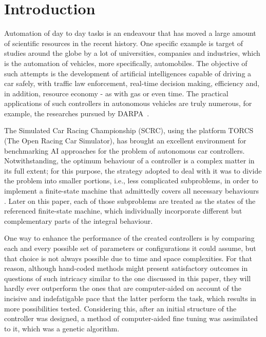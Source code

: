 \section{\textbf{Introduction}} \label{sec:Intro}

	Automation of day to day tasks is an endeavour that has moved a large amount of scientific resources in the
	recent history. One specific example is target of studies around the globe by a lot of universities, companies
	and industries, which is the automation of vehicles, more specifically, automobiles. The objective of such
	attempts is the development of artificial intelligences capable of driving a car safely, with traffic law
	enforcement, real-time decision making, efficiency and, in addition, resource economy - as with gas or even
	time. The practical applications of such controllers in autonomous vehicles are truly numerous, for example, the
	researches pursued by DARPA~\cite{DARPA}.


	The Simulated Car Racing Championship (SCRC), using the platform TORCS (The Open Racing Car Simulator), has
	brought an excellent environment for benchmarking AI approaches for the problem of autonomous car controllers.
	Notwithstanding, the optimum behaviour of a controller is a complex matter in its full extent; for this purpose,
	the strategy adopted to deal with it  was to divide the problem into smaller portions, i.e., less complicated
	subproblems, in order to implement a finite-state machine that admittedly covers all necessary behaviours . Later
	on this paper, each of those subproblems are treated as the states of the referenced finite-state machine, which
	individually incorporate different but complementary parts of the integral behaviour.

	One way to enhance the performance of the created controllers is by comparing  each and every possible set of
	parameters or configurations it could assume, but that choice is not always possible due to time and space
	complexities. For that reason, although hand-coded methods  might present satisfactory outcomes in questions of
	such intricacy  similar to the one discussed in this paper, they will hardly ever outperform the ones that are
	computer-aided on account of the incisive and indefatigable pace that the latter perform the task, which results
	in more possibilities tested. Considering this, after an initial structure of the controller was designed, a
	method of computer-aided fine tuning was assimilated to it, which was a genetic algorithm.

